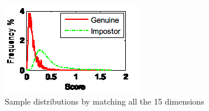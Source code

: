 \begin{figure}[htb]
  \begin{center}
    \includegraphics[scale=1]{ch-experiment/figures/11p}
    \caption{Sample distributions by matching all the 15 dimensions}
    \label{fig:experiment:11p}
  \end{center}
\end{figure}

